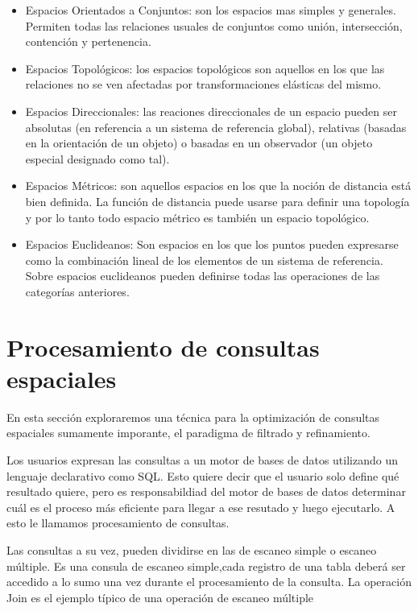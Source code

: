 \begin{itemize}
    \item Espacios Orientados a Conjuntos: son los espacios mas simples y generales.
    Permiten todas las relaciones usuales de conjuntos como unión, intersección, contención y pertenencia.
    \item Espacios Topológicos: los espacios topológicos son aquellos en los que las relaciones no se ven afectadas
    por transformaciones elásticas del mismo.
    \item Espacios Direccionales: las reaciones direccionales de un espacio pueden ser
    absolutas (en referencia a un sistema de referencia global),
    relativas (basadas en la orientación de un objeto)
    o basadas en un observador (un objeto especial designado como tal).
    \item Espacios Métricos: son aquellos espacios en los que la noción de distancia está bien definida. La función de distancia puede usarse
    para definir una topología y por lo tanto todo espacio métrico es también un espacio topológico.
    \item Espacios Euclideanos: Son espacios en los que los puntos pueden expresarse como la combinación lineal de los elementos de
    un sistema de referencia. Sobre espacios euclideanos pueden definirse todas las operaciones de las categorías anteriores.
\end{itemize}


\section{Procesamiento de consultas espaciales}

En esta sección exploraremos una técnica para la optimización de consultas espaciales sumamente imporante,
el paradigma de filtrado y refinamiento.

Los usuarios expresan las consultas a un motor de bases de datos utilizando un lenguaje declarativo como SQL.
Esto quiere decir que el usuario solo define qué resultado quiere, pero es responsabildiad del motor de bases de datos
determinar cuál es el proceso más eficiente para llegar a ese resutado y luego ejecutarlo. A esto le llamamos procesamiento de consultas.

Las consultas a su vez, pueden dividirse en las de escaneo simple o escaneo múltiple.
Es una consula de escaneo simple,cada registro de una tabla deberá ser accedido a lo sumo una vez durante el procesamiento de la consulta.
La operación Join es el ejemplo típico de una operación de escaneo múltiple